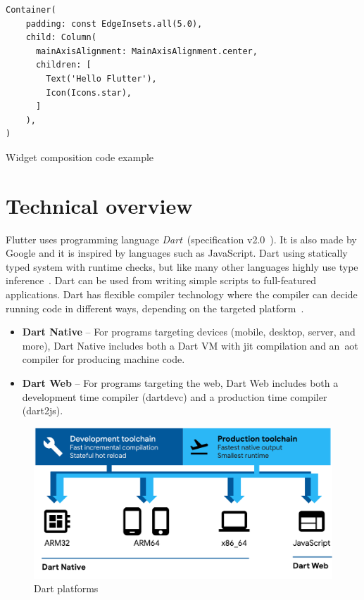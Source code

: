 \begin{listing}[ht]
\begin{verbatim}
Container(
    padding: const EdgeInsets.all(5.0),
    child: Column(
      mainAxisAlignment: MainAxisAlignment.center,
      children: [
        Text('Hello Flutter'),
        Icon(Icons.star),
      ]
    ),
)
\end{verbatim}
\caption{Widget composition code example}
\label{listing:hello-flutter}
\end{listing}
\section{Technical overview}
Flutter uses programming language \textit{Dart}~(specification v2.0~\cite{dart-specs}). It is also made by Google and it is inspired by languages such as JavaScript. Dart using statically typed system with runtime checks, but like many other languages highly use type inference~\cite{dart-type-system}. Dart can be used from writing simple scripts to full-featured applications. Dart has flexible compiler technology where the compiler can decide running code in different ways, depending on the targeted platform~\cite{dart-platforms}. 

\begin{itemize}
    \item \textbf{Dart Native} -- For programs targeting devices (mobile, desktop, server, and more), Dart Native includes both a Dart VM with \gls{jit} compilation and an~\gls{aot} compiler for producing machine code.
    \item \textbf{Dart Web} -- For programs targeting the web, Dart Web includes both a development time compiler (dartdevc) and a production time compiler (dart2js).
\end{itemize}

\begin{figure}[htp]
    \centering
    \includegraphics[width=0.8\linewidth]{img/flutter/dart-platforms.pdf}
    \caption{Dart platforms~\cite{dart-platforms}}
    \label{fig:dart-platform}
\end{figure}

